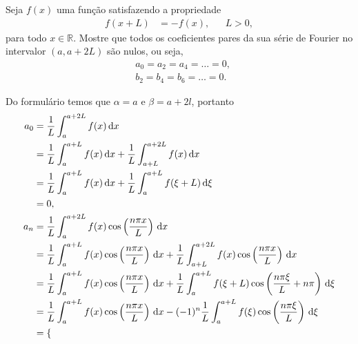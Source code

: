 \documentclass[a4paper,12pt, leqno, answers]{exam}
\begin{document}
\begin{questions}

  \question[P1 de 2006] Seja $f(x)$ uma função satisfazendo a propriedade
  \begin{align*}
    f(x + L) &= -f(x), && L > 0,
  \end{align*}
  para todo $x \in \mathbb{R}$. Mostre que todos os coeficientes pares da sua série de Fourier no intervalor $(a, a + 2 L)$ são nulos, ou seja,
  \begin{align*}
    & a_0 = a_2 = a_4 = \ldots = 0, \\
    & b_2 = b_4 = b_6 = \ldots = 0.
  \end{align*}
  \begin{solution}
    Do formulário temos que $\alpha = a$ e $\beta = a + 2 l$, portanto
    \begin{align*}
      a_0 &= \frac{1}{L} \int_a^{a + 2 L} f(x) \, \mathrm{d}x \\
      &= \frac{1}{L} \int_a^{a + L} f(x) \, \mathrm{d}x + \frac{1}{L} \int_{a + L}^{a + 2 L} f(x) \, \mathrm{d}x \\
      &= \frac{1}{L} \int_a^{a + L} f(x) \, \mathrm{d}x + \frac{1}{L} \int_a^{a + L} f(\xi + L) \, \mathrm{d}\xi \\
      &= 0, \\
      a_n &= \frac{1}{L} \int_a^{a + 2 L} f(x) \cos\left( \frac{n \pi x}{L} \right) \, \mathrm{d}x \\
      &= \frac{1}{L} \int_a^{a + L} f(x) \cos\left( \frac{n \pi x}{L} \right) \, \mathrm{d}x + \frac{1}{L} \int_{a + L}^{a + 2 L} f(x) \cos\left( \frac{n \pi x}{L} \right) \, \mathrm{d}x \\
      &= \frac{1}{L} \int_a^{a + L} f(x) \cos\left( \frac{n \pi x}{L} \right) \, \mathrm{d}x + \frac{1}{L} \int_a^{a + L} f(\xi + L) \cos\left( \frac{n \pi \xi}{L} + n \pi \right) \, \mathrm{d}\xi \\
      &= \frac{1}{L} \int_a^{a + L} f(x) \cos\left( \frac{n \pi x}{L} \right) \, \mathrm{d}x - (-1)^n \frac{1}{L} \int_a^{a + L} f(\xi) \cos\left( \frac{n \pi \xi}{L} \right) \, \mathrm{d}\xi \\
      &= \begin{cases}

\end{cases}
\end{align*}
\end{solution}
\end{questions}
\end{document}

